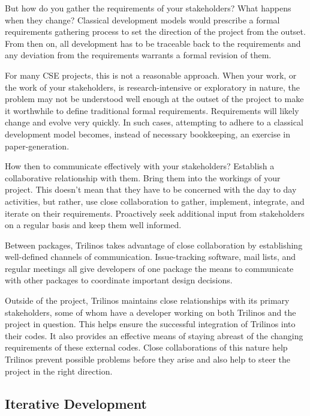 \documentclass[12pt,relax]{article}
\begin{document}
But how do you gather the requirements of your stakeholders?  What happens
when they change?  Classical development models would prescribe a formal
requirements gathering process to set the direction of the project from the
outset.  From then on, all development has to be traceable back to the
requirements and any deviation from the requirements warrants a formal revision
of them.  

For many CSE projects, this is not a reasonable approach.  When your work, or 
the work of your stakeholders, is research-intensive or exploratory in nature, 
the problem may not be understood well enough at the outset of the project to 
make it worthwhile to define traditional formal requirements.  Requirements 
will likely change and evolve very quickly.  In such cases, attempting to
adhere to a classical development model becomes, instead of necessary
bookkeeping, an exercise in paper-generation.

How then to communicate effectively with your stakeholders?  Establish a
collaborative relationship with them.  Bring them into the workings of your
project.  This doesn't mean that they have to be concerned with the day to day
activities, but rather, use close collaboration to gather, implement,
integrate, and iterate on their requirements.  Proactively seek additional
input from stakeholders on a regular basis and keep them well informed.

Between packages, Trilinos takes advantage of close collaboration by 
establishing well-defined channels of communication.  Issue-tracking
software, mail lists, and regular meetings all give developers of one package
the means to communicate with other packages to coordinate important design
decisions.

Outside of the project, Trilinos maintains close relationships with its primary
stakeholders, some of whom have a developer working on both Trilinos and the
project in question.  This helps ensure the successful integration of Trilinos
into their codes.  It also provides an effective means of staying abreast of
the changing requirements of these external codes.  Close collaborations of
this nature help Trilinos prevent possible problems before they arise and also
help to steer the project in the right direction.

\subsection{Iterative Development}
\end{document}
